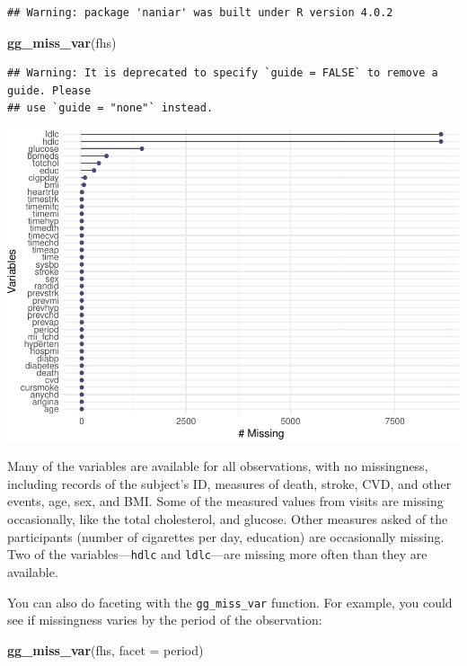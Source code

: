 \documentclass[
]{book}
\newenvironment{Shaded}{\begin{snugshade}}{\end{snugshade}}
\newcommand{\DataTypeTok}[1]{\textcolor[rgb]{0.13,0.29,0.53}{#1}}
\newcommand{\KeywordTok}[1]{\textcolor[rgb]{0.13,0.29,0.53}{\textbf{#1}}}
\newcommand{\NormalTok}[1]{#1}
\begin{document}
\begin{verbatim}
## Warning: package 'naniar' was built under R version 4.0.2
\end{verbatim}

\begin{Shaded}
\begin{Highlighting}[]
\KeywordTok{gg_miss_var}\NormalTok{(fhs)}
\end{Highlighting}
\end{Shaded}

\begin{verbatim}
## Warning: It is deprecated to specify `guide = FALSE` to remove a guide. Please
## use `guide = "none"` instead.
\end{verbatim}

\includegraphics{adv_epi_analysis_files/figure-latex/unnamed-chunk-153-1.pdf}

Many of the variables are available for all observations, with no missingness,
including records of the subject's ID, measures of death, stroke, CVD, and other
events, age, sex, and BMI. Some of the measured values from visits are missing
occasionally, like the total cholesterol, and glucose. Other measures asked of
the participants (number of cigarettes per day, education) are occasionally
missing. Two of the variables---\texttt{hdlc} and \texttt{ldlc}---are missing more often than
they are available.

You can also do faceting with the \texttt{gg\_miss\_var} function. For
example, you could see if missingness varies by the period of the observation:

\begin{Shaded}
\begin{Highlighting}[]
\KeywordTok{gg_miss_var}\NormalTok{(fhs, }\DataTypeTok{facet =}\NormalTok{ period)}
\end{Highlighting}
\end{Shaded}
\end{document}
